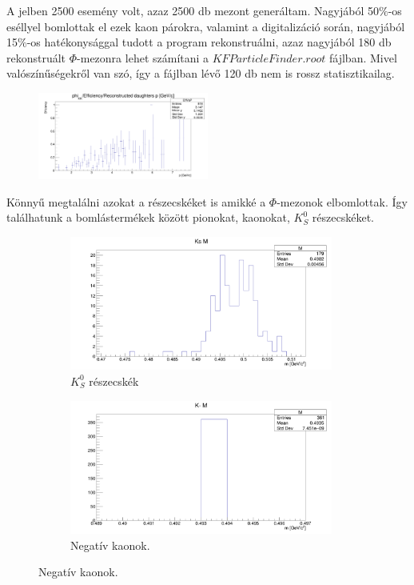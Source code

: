 \documentclass[a4paper,12pt]{article}
\begin{document}
\par A jelben 2500 esemény volt, azaz 2500 db mezont generáltam. Nagyjából 50$\%$-os eséllyel bomlottak el ezek kaon párokra, 
valamint a digitalizáció során, nagyjából 15$\%$-os hatékonysággal tudott a program rekonstruálni, azaz nagyjából 180 db rekonstruált
$\Phi$-mezonra lehet számítani a $KFParticleFinder.root$ fájlban. Mivel valószínűségekről van szó, így a fájlban lévő 120 db nem is rossz
statisztikailag.
\begin{figure}[H]
	\centering
	\includegraphics[width=0.5\textwidth]{reconstructed_eff_phi2500.png}
\end{figure}
\par Könnyű megtalálni azokat a részecskéket is amikké a $\Phi$-mezonok elbomlottak. Így találhatunk a bomlástermékek között
pionokat, kaonokat, $K^{0}_{S}$ részecskéket. 
\begin{figure}[H]
	\centering
	\begin{subfigure}{0.49\textwidth}
		\centering
		\includegraphics[width=0.95\textwidth]{kshort_phi2500.png}
		\caption{ $K^{0}_{S}$ részecskék }
	\end{subfigure}
	\begin{subfigure}{0.49\textwidth}
		\centering
		\includegraphics[width=0.95\textwidth]{k-_phi2500.png}
		\caption{ Negatív kaonok. }
	\end{subfigure}
\end{figure}
\end{document}
